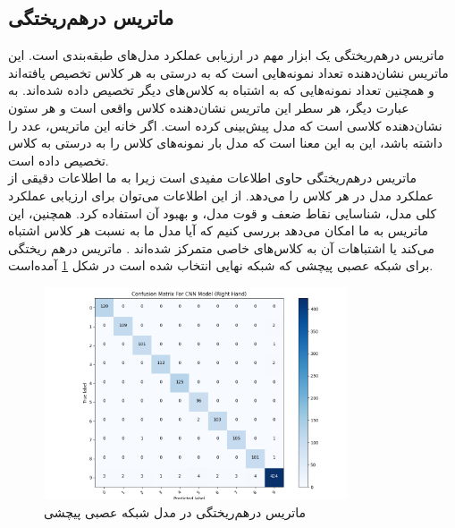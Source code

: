

\subsection[ماتریس درهم‌ریختگی]{ماتریس درهم‌ریختگی\protect{}}
ماتریس درهم‌ریختگی یک ابزار مهم در ارزیابی عملکرد مدل‌های طبقه‌بندی است. این ماتریس نشان‌دهنده تعداد نمونه‌هایی است که به درستی به هر کلاس تخصیص یافته‌اند و همچنین تعداد نمونه‌هایی که به اشتباه به کلاس‌های دیگر تخصیص داده شده‌اند. به عبارت دیگر، هر سطر این ماتریس نشان‌دهنده کلاس واقعی است و هر ستون نشان‌دهنده کلاسی است که مدل پیش‌بینی کرده است. اگر خانه  این ماتریس، عدد  را داشته باشد، این به این معنا است که مدل  بار نمونه‌های کلاس  را به درستی به کلاس  تخصیص داده است.
\\
ماتریس درهم‌ریختگی حاوی اطلاعات مفیدی است زیرا به ما اطلاعات دقیقی از عملکرد مدل در هر کلاس را می‌دهد. از این اطلاعات می‌توان برای ارزیابی عملکرد کلی مدل، شناسایی نقاط ضعف و قوت مدل، و بهبود آن استفاده کرد. همچنین، این ماتریس به ما امکان می‌دهد بررسی کنیم که آیا مدل ما به نسبت هر کلاس اشتباه می‌کند یا اشتباهات آن به کلاس‌های خاصی متمرکز شده‌اند \cite{Confusio72:online}.
ماتریس درهم ریختگی برای شبکه عصبی پیچشی که شبکه نهایی انتخاب شده  است در شکل \ref{matrix} آمده‌است.



\begin{figure}[h]
    \centering
    \includegraphics[width=0.8\textwidth]{Matrix_CNN_right.png}
    \caption{ ماتریس درهم‌ریختگی در مدل شبکه عصبی پیچشی}
    \label{matrix}
\end{figure}


